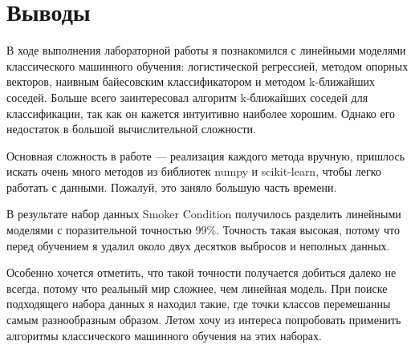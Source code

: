 \section{Выводы}
В ходе выполнения лабораторной работы я познакомился с линейными моделями классического машинного обучения: логистической регрессией, методом опорных векторов, наивным байесовским классификатором и методом k-ближайших соседей. Больше всего заинтересовал алгоритм k-ближайших соседей для классификации, так как он кажется интуитивно наиболее хорошим. Однако его недостаток в большой вычислительной сложности.

Основная сложность в работе --- реализация каждого метода вручную, пришлось искать очень много методов из библиотек numpy и scikit-learn, чтобы легко работать с данными. Пожалуй, это заняло большую часть времени.

В результате набор данных Smoker Condition получилось разделить линейными моделями с поразительной точностью 99\%. Точность такая высокая, потому что перед обучением я удалил около двух десятков выбросов и неполных данных.

Особенно хочется отметить, что такой точности получается добиться далеко не всегда, потому что реальный мир сложнее, чем линейная модель. При поиске подходящего набора данных я находил такие, где точки классов перемешанны самым разнообразным образом. Летом хочу из интереса попробовать применить алгоритмы классического машинного обучения на этих наборах.
\pagebreak
